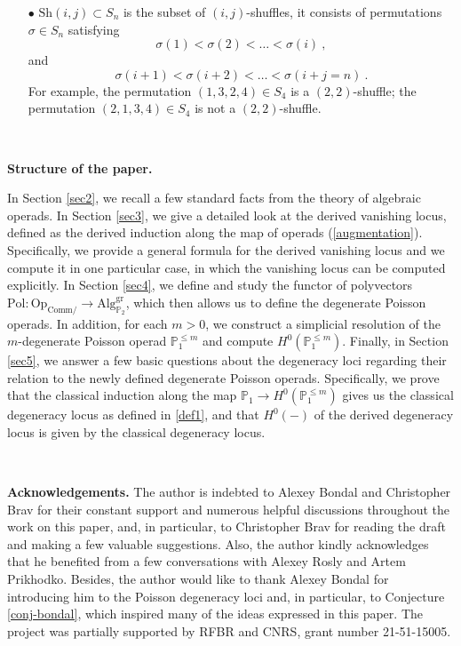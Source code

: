 \documentclass[10pt, oneside]{amsart}
\theoremstyle{plain}
\newcommand{\alg}{\mathrm{Alg}}
\newcommand{\comm}{\mathrm{Comm}}
\newcommand{\op}{\mathrm{Op}}
\newcommand{\PP}{\mathbb{P}}
\newcommand{\pol}{\mathrm{Pol}}
\newcommand{\s}{\sigma}
\newcommand{\sh}{\mathrm{Sh}}
\begin{document}
\begin{enumerate}
\item[$\bullet$] $\sh(i,j) \subset S_n$ is the subset of $(i,j)$-shuffles, it consists of permutations $\s \in S_n$ satisfying
\begin{equation*}
\s(1) < \s(2) < \ldots < \s(i) \:,
\end{equation*} and
\begin{equation*}
\s(i+1) < \s(i+2) < \ldots < \s(i+j = n) \:.
\end{equation*}
For example, the permutation $(1, 3, 2, 4) \in S_4$ is a $(2,2)$-shuffle; the permutation $(2, 1, 3, 4) \in S_4$ is not a 
$(2,2)$-shuffle.

\end{enumerate}

\

\smallskip

\noindent \textbf{Structure of the paper.}

In Section \ref{sec2}, we recall a few standard facts from the theory of algebraic operads.
In Section \ref{sec3}, we give a detailed look at the derived vanishing locus, defined as the derived induction along the map of 
operads (\ref{augmentation}). Specifically, we provide a general formula for the derived vanishing locus and we compute it in one 
particular 
case, in which the vanishing locus can be computed explicitly. In Section \ref{sec4}, we define and study the functor of polyvectors
$\pol \colon \op_{\comm/} \longrightarrow \alg^\text{gr}_{\PP_2}$, which then allows us to define the degenerate Poisson operads.
In addition, for each $m > 0$, we construct a simplicial resolution of the $m$-degenerate Poisson operad $\PP_1^{\le m}$
and compute $H^0(\PP_1^{\le m})$.
Finally, in Section \ref{sec5}, we answer a few basic questions about the degeneracy loci regarding their relation to the newly 
defined degenerate Poisson operads. Specifically, we prove that the classical induction along the map
$\PP_1 \to H^0(\PP_1^{\le m})$ 
gives us the classical degeneracy locus as defined in \ref{def1}, and that $H^0(-)$ of the derived degeneracy locus is given by the
classical degeneracy locus.

\

\smallskip

\noindent \textbf{Acknowledgements.} The author is indebted to Alexey Bondal and Christopher Brav for their constant support
and numerous helpful discussions throughout the work on this paper, and, in particular, to Christopher Brav for reading the draft
and making a few valuable suggestions. Also, the author kindly acknowledges that he benefited from
a few conversations with Alexey Rosly and Artem Prikhodko. Besides, the author would like to thank Alexey Bondal for introducing
him to the Poisson degeneracy loci and, in particular, to Conjecture \ref{conj-bondal}, which inspired many of the ideas 
expressed in this paper. The project was partially supported by RFBR and CNRS, grant number 21-51-15005.
\end{document}
